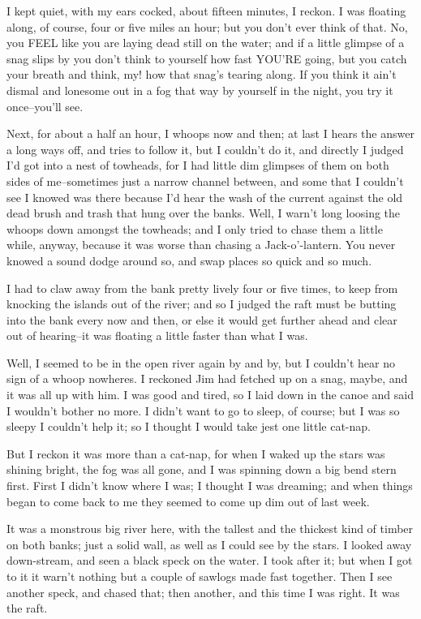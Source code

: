 I kept quiet, with my ears cocked, about fifteen minutes, I reckon.  I
was floating along, of course, four or five miles an hour; but you don't
ever think of that.  No, you FEEL like you are laying dead still on the
water; and if a little glimpse of a snag slips by you don't think to
yourself how fast YOU'RE going, but you catch your breath and think, my!
how that snag's tearing along.  If you think it ain't dismal and lonesome
out in a fog that way by yourself in the night, you try it once--you'll
see.

Next, for about a half an hour, I whoops now and then; at last I hears
the answer a long ways off, and tries to follow it, but I couldn't do it,
and directly I judged I'd got into a nest of towheads, for I had little
dim glimpses of them on both sides of me--sometimes just a narrow channel
between, and some that I couldn't see I knowed was there because I'd hear
the wash of the current against the old dead brush and trash that hung
over the banks.  Well, I warn't long loosing the whoops down amongst the
towheads; and I only tried to chase them a little while, anyway, because
it was worse than chasing a Jack-o'-lantern.  You never knowed a sound
dodge around so, and swap places so quick and so much.

I had to claw away from the bank pretty lively four or five times, to
keep from knocking the islands out of the river; and so I judged the raft
must be butting into the bank every now and then, or else it would get
further ahead and clear out of hearing--it was floating a little faster
than what I was.

Well, I seemed to be in the open river again by and by, but I couldn't
hear no sign of a whoop nowheres.  I reckoned Jim had fetched up on a
snag, maybe, and it was all up with him.  I was good and tired, so I laid
down in the canoe and said I wouldn't bother no more.  I didn't want to
go to sleep, of course; but I was so sleepy I couldn't help it; so I
thought I would take jest one little cat-nap.

But I reckon it was more than a cat-nap, for when I waked up the stars
was shining bright, the fog was all gone, and I was spinning down a big
bend stern first.  First I didn't know where I was; I thought I was
dreaming; and when things began to come back to me they seemed to come up
dim out of last week.

It was a monstrous big river here, with the tallest and the thickest kind
of timber on both banks; just a solid wall, as well as I could see by the
stars.  I looked away down-stream, and seen a black speck on the water.
I took after it; but when I got to it it warn't nothing but a couple of
sawlogs made fast together.  Then I see another speck, and chased that;
then another, and this time I was right.  It was the raft.

